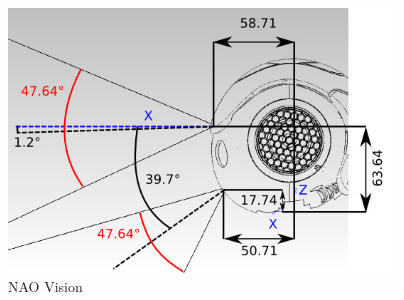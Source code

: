 \begin{figure}
	[h] \centering 
	\includegraphics[height=7cm]{figures/content/nao-vision.jpg} \caption{NAO Vision} \label{fg:nao:vision} 
\end{figure}
